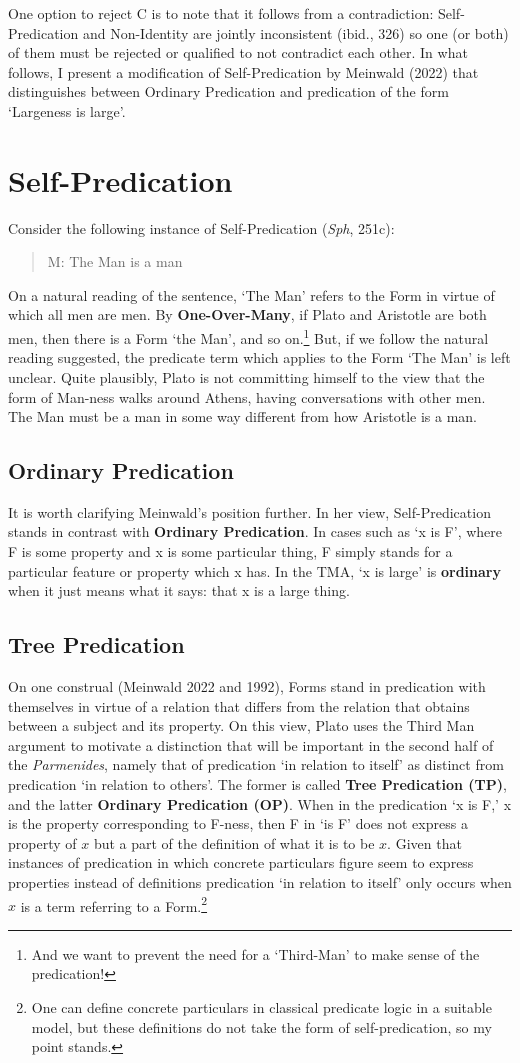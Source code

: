 \documentclass [article] {memoir}
\begin{document}
One option to reject C is to note that it follows from a contradiction: Self-Predication and Non-Identity are jointly inconsistent (ibid., 326) so one (or both) of them must be rejected or qualified to not contradict each other. In what follows, I present a modification of Self-Predication by Meinwald (2022) that distinguishes between Ordinary Predication and predication of the form `Largeness is large'.
\chapter{Self-Predication}
Consider the following instance of Self-Predication (\textit{Sph}, 251c): 
\begin{quote}
M: The Man is a man
\end{quote}
On a natural reading of the sentence, ‘The Man’ refers to the Form in virtue of which all men are men. By \textbf{One-Over-Many}, if Plato and Aristotle are both men, then there is a Form ‘the Man’, and so on.\footnote{And we want to prevent the need for a  `Third-Man' to make sense of the predication!} But, if we follow the natural reading suggested, the predicate term which applies to the Form ‘The Man’ is left unclear. Quite plausibly, Plato is not committing himself to the view that the form of Man-ness walks around Athens, having conversations with other men. The Man must be a man in some way different from how Aristotle is a man. 
\section{Ordinary Predication}
It is worth clarifying Meinwald's position further. In her view, Self-Predication stands in contrast with \textbf{Ordinary Predication}. In cases such as `x is F', where F is some property and x is some particular thing, F simply stands for a particular feature or property which x has. In the TMA, `x is large' is \textbf{ordinary} when it just means what it says: that x is a large thing.
\section{Tree Predication}
On one construal (Meinwald 2022 and 1992), Forms stand in predication with themselves in virtue of a relation that differs from the relation that obtains between a subject and its property. On this view, Plato uses the Third Man argument to motivate a distinction that will be important in the second half of the \textit{Parmenides}, namely that of predication ‘in relation to itself’ as distinct from predication ‘in relation to others’. The former is called \textbf{Tree Predication (TP)}, and the latter \textbf{Ordinary Predication (OP)}.  When in the predication ‘x is F,’ x is the property corresponding to F-ness, then F in `is F' does not express a property of $x$ but a part of the definition of what it is to be $x$. Given that instances of predication in which concrete particulars figure seem to express properties instead of definitions predication ‘in relation to itself’ only occurs when $x$ is a term referring to a Form.\footnote{One can define concrete particulars in classical predicate logic in a suitable model, but these definitions do not take the form of self-predication, so my point stands.}
\end{document}
